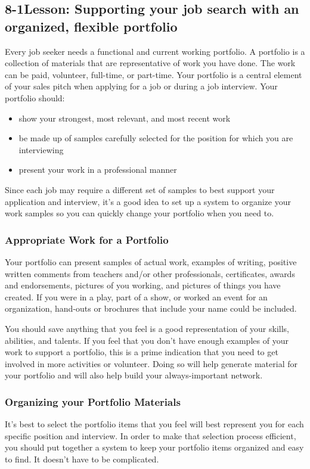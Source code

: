 \pagebreak \subsection*{8-1\quad Lesson: Supporting your job search with an organized, flexible portfolio}
Every job seeker needs a functional and current working portfolio. A portfolio is a collection of materials that are representative of work you have done. The work can be paid, volunteer, full-time, or part-time. Your portfolio is a central element of your sales pitch when applying for a job or during a job interview.
Your portfolio should:
\begin{itemize}[leftmargin=*]
\item show your strongest, most relevant, and most recent work
\item be made up of samples carefully selected for the position for which you are interviewing
\item present your work in a professional manner
\end{itemize}
Since each job may require a different set of samples to best support your application and interview, it's a good idea to set up a system to organize your work samples so you can quickly change your portfolio when you need to.
\subsubsection*{Appropriate Work for a Portfolio}
Your portfolio can present samples of actual work, examples of writing, positive written comments from teachers and/or other professionals, certificates, awards and endorsements, pictures of you working, and pictures of things you have created. If you were in a play, part of a show, or worked an event for an organization, hand-outs or brochures that include your name could be included.

You should save anything that you feel is a good representation of your skills, abilities, and talents. If you feel that you don't have enough examples of your work to support a portfolio, this is a prime indication that you need to get involved in more activities or volunteer. Doing so will help generate material for your portfolio and will also help build your always-important network.
\subsubsection*{Organizing your Portfolio Materials}
It's best to select the portfolio items that you feel will best represent you for each specific position and interview. In order to make that selection process efficient, you should put together a system to keep your portfolio items organized and easy to find. It doesn't have to be complicated.

